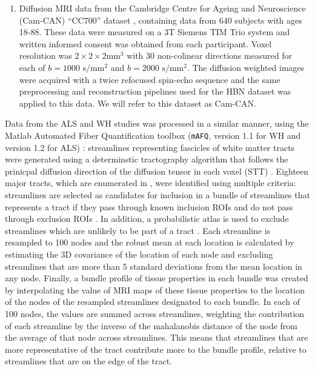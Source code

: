 \documentclass[10pt,letterpaper]{article}
\begin{document}
\begin{enumerate}
\item Diffusion MRI data from the Cambridge Centre for Ageing and
Neuroscience (Cam-CAN) ``CC700'' dataset
\cite{shafto2014cambridge,taylor2017cambridge}, containing data from 640
subjects with ages 18-88. These data were measured on a 3T Siemens TIM Trio
system and written informed consent was obtained from each participant. Voxel
resolution was $2 \times 2 \times 2 \text{mm}^3$ with 30 non-colinear directions
measured for each of $b=1000$ $\text{s} / \text{mm}^2$ and $b=2000$
$\text{s} / \text{mm}^2$. The diffusion weighted images were acquired
with a twice refocused spin-echo sequence and the same preprocessing
and reconstruction pipelines
used for the HBN dataset was applied to this data. We will refer to this
dataset as Cam-CAN.

\end{enumerate}

Data from the ALS and WH studies was processed in a similar manner,
using the Matlab Automated Fiber Quantification toolbox
(\texttt{mAFQ}, version 1.1 for WH and version 1.2 for ALS)
\cite{yeatman2012tract}: streamlines representing fascicles of white
matter tracts were generated using a determinstic tractography algorithm
that follows the prinicpal diffusion direction of the diffusion tensor
in each voxel (STT) \cite{basser2000vivo}. Eighteen major
tracts, which are enumerated in , were identified
using multiple criteria: streamlines are selected as candidates for
inclusion in a bundle of streamlines that represents a tract if they
pass through known inclusion ROIs and do not pass through exclusion
ROIs \cite{wakana2007reproducibility}. In addition, a probabilistic
atlas is used to exclude streamlines which are unlikely to be part of
a tract \cite{Hua2008-sh}. Each streamline is resampled to 100 nodes
and the robust mean at each location is calculated by estimating the 3D
covariance of the location of each node and excluding streamlines that
are more than 5 standard deviations from the mean location in any node.
Finally, a bundle profile of tissue properties in each bundle was created
by interpolating the value of MRI maps of these tissue properties to the
location of the nodes of the resampled streamlines designated to each
bundle. In each of 100 nodes, the values are summed across streamlines,
weighting the contribution of each streamline by the inverse of the
mahalanobis distance of the node from the average of
that node across streamlines. This means that streamlines that are more
representative of the tract contribute more to the bundle profile, relative
to streamlines that are on the edge of the tract.
\end{document}
